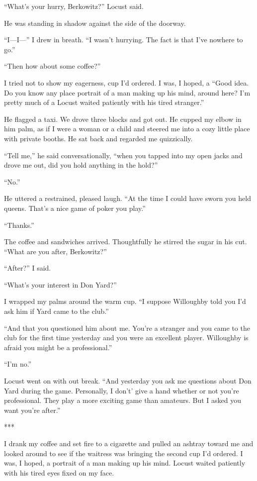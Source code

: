 {“What’s your hurry, Berkowitz?” Locust said.

He was standing in shadow against the side of the doorway.

“I—I—” I drew in breath. “I wasn’t hurrying. The fact is that I’ve nowhere to go.”

“Then how about some coffee?”

I tried not to show my eagerness, cup I’d ordered. I was, I hoped, a “Good idea. Do you know any place portrait of a man making up his mind, around here? I’m pretty much of a Locust waited patiently with his tired stranger.”

He flagged a taxi. We drove three blocks and got out. He cupped my elbow in him palm, as if I were a woman or a child and steered me into a cozy little place with private booths. He sat back and regarded me quizzically.

“Tell me,” he said conversationally, “when you tapped into my open jacks and drove me out, did you hold anything in the hold?”

“No.”

He uttered a restrained, pleased laugh. “At the time I could have sworn you held queens. That’s a nice game of poker you play.”

“Thanks.”

The coffee and sandwiches arrived. Thoughtfully he stirred the sugar in his cut. “What are you after, Berkowitz?”

“After?” I said.

“What’s your interest in Don Yard?”

I wrapped my palms around the warm cup. “I suppose Willoughby told you I’d ask him if Yard came to the club.”

“And that you questioned him about me. You’re a stranger and you came to the club for the first time yesterday and you were an excellent player. Willoughby is afraid you might be a professional.”

“I’m no.”

Locust went on with out break. “And yesterday you ask me questions about Don Yard during the game. Personally, I don’t’ give a hand whether or not you’re professional. They play a more exciting game than amateurs. But I asked you want you’re after.”

***

I drank my coffee and set fire to a cigarette and pulled an ashtray toward me and looked around to see if the waitress was bringing the second cup I’d ordered. I was, I hoped, a portrait of a man making up his mind. Locust waited patiently with his tired eyes fixed on my face.

}
